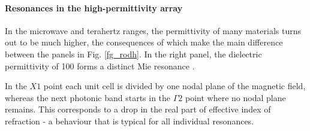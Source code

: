 \paragraph{Resonances in the high-permittivity array} %
In the microwave and terahertz ranges, the permittivity of many materials turns out to be much higher, the consequences of which make the main difference between the panels in Fig. \ref{fg_rodh}. In the right panel, the dielectric permittivity of 100 forms a distinct Mie resonance \cite{obrien2002photonic}. 

In the $X1$ point each unit cell is divided by one nodal plane of the magnetic field, whereas the next photonic band starts in the $\Gamma2$ point where no nodal plane remains. This corresponds to a drop in the real part of effective index of refraction - a behaviour that is typical for all individual resonances.



